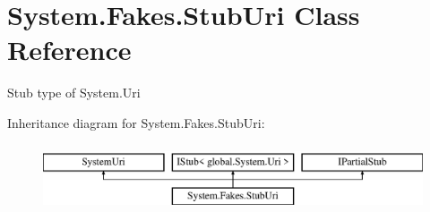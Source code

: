 \hypertarget{class_system_1_1_fakes_1_1_stub_uri}{\section{System.\-Fakes.\-Stub\-Uri Class Reference}
\label{class_system_1_1_fakes_1_1_stub_uri}
}


Stub type of System.\-Uri 


Inheritance diagram for System.\-Fakes.\-Stub\-Uri\-:\begin{figure}[H]
\begin{center}
\leavevmode
\includegraphics[height=2.000000cm]{class_system_1_1_fakes_1_1_stub_uri}
\end{center}
\end{figure}
